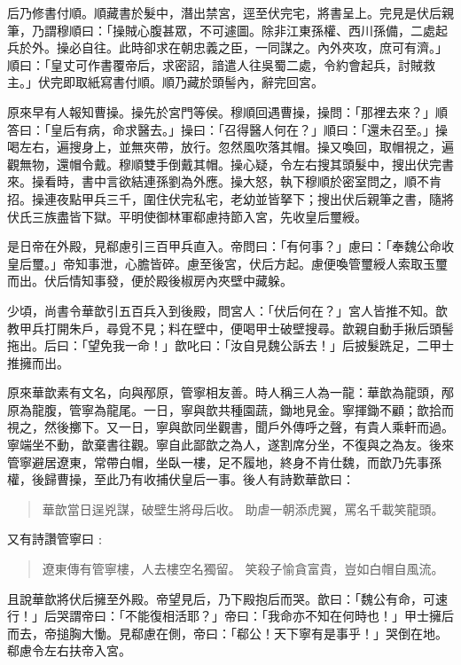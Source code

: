 后乃修書付順。順藏書於髮中，潛出禁宮，逕至伏完宅，將書呈上。完見是伏后親筆，乃謂穆順曰：「操賊心腹甚眾，不可遽圖。除非江東孫權、西川孫備，二處起兵於外。操必自往。此時卻求在朝忠義之臣，一同謀之。內外夾攻，庶可有濟。」順曰：「皇丈可作書覆帝后，求密詔，諳遣人往吳蜀二處，令約會起兵，討賊救主。」伏完即取紙寫書付順。順乃藏於頭髻內，辭完回宮。

原來早有人報知曹操。操先於宮門等侯。穆順回遇曹操，操問：「那裡去來？」順答曰：「皇后有病，命求醫去。」操曰：「召得醫人何在？」順曰：「還未召至。」操喝左右，遍搜身上，並無夾帶，放行。忽然風吹落其帽。操又喚回，取帽視之，遍觀無物，還帽令戴。穆順雙手倒戴其帽。操心疑，令左右搜其頭髮中，搜出伏完書來。操看時，書中言欲結連孫劉為外應。操大怒，執下穆順於密室問之，順不肯招。操連夜點甲兵三千，圍住伏完私宅，老幼並皆拏下；搜出伏后親筆之書，隨將伏氏三族盡皆下獄。平明使御林軍郗慮持節入宮，先收皇后璽綬。

是日帝在外殿，見郗慮引三百甲兵直入。帝問曰：「有何事？」慮曰：「奉魏公命收皇后璽。」帝知事泄，心膽皆碎。慮至後宮，伏后方起。慮便喚管璽綬人索取玉璽而出。伏后情知事發，便於殿後椒房內夾壁中藏躲。

少頃，尚書令華歆引五百兵入到後殿，問宮人：「伏后何在？」宮人皆推不知。歆教甲兵打開朱戶，尋覓不見；料在壁中，便喝甲士破壁搜尋。歆親自動手揪后頭髻拖出。后曰：「望免我一命！」歆叱曰：「汝自見魏公訴去！」后披髮跣足，二甲士推擁而出。

原來華歆素有文名，向與邴原，管寧相友善。時人稱三人為一龍：華歆為龍頭，邴原為龍腹，管寧為龍尾。一日，寧與歆共種園蔬，鋤地見金。寧揮鋤不顧；歆拾而視之，然後擲下。又一日，寧與歆同坐觀書，聞戶外傳呼之聲，有貴人乘軒而過。寧端坐不動，歆棄書往觀。寧自此鄙歆之為人，遂割席分坐，不復與之為友。後來管寧避居遼東，常帶白帽，坐臥一樓，足不履地，終身不肯仕魏，而歆乃先事孫權，後歸曹操，至此乃有收捕伏皇后一事。後人有詩歎華歆曰：

\begin{quote}
華歆當日逞兇謀，破壁生將母后收。
助虐一朝添虎翼，罵名千載笑龍頭。
\end{quote}

又有詩讚管寧曰﹕

\begin{quote}
遼東傳有管寧樓，人去樓空名獨留。
笑殺子愉貪富貴，豈如白帽自風流。
\end{quote}

且說華歆將伏后擁至外殿。帝望見后，乃下殿抱后而哭。歆曰：「魏公有命，可速行！」后哭謂帝曰：「不能復相活耶？」帝曰：「我命亦不知在何時也！」甲士擁后而去，帝搥胸大慟。見郗慮在側，帝曰：「郗公！天下寧有是事乎！」哭倒在地。郗慮令左右扶帝入宮。


